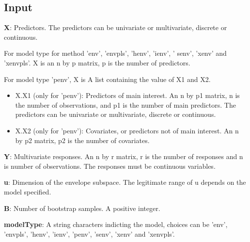 \documentclass[a4paper,11pt,openany]{memoir}
\begin{document}
\subsection*{Input}

\begin{par}
\textbf{X}: Predictors.   The predictors can be univariate or multivariate, discrete or continuous.
\end{par} \vspace{1em}
\begin{par}
For model type for method 'env', 'envpls', 'henv', 'ienv', ' senv', 'xenv' and 'xenvpls'. X is an n by p matrix, p is the number of predictors.
\end{par} \vspace{1em}
\begin{par}
For model type 'penv', X is  A list containing the value of X1 and X2.
\end{par} \vspace{1em}
\begin{itemize}
\setlength{\itemsep}{-1ex}
   \item X.X1 (only for 'penv'): Predictors of main interest. An n by p1 matrix, n is the number of observations, and p1 is the number of main predictors. The predictors can be univariate or multivariate, discrete or continuous.
   \item X.X2 (only for 'penv'): Covariates, or predictors not of main interest.  An n by p2 matrix, p2 is the number of covariates.
\end{itemize}
\begin{par}
\textbf{Y}: Multivariate responses. An n by r matrix, r is the number of responses and n is number of observations. The responses must be continuous variables.
\end{par} \vspace{1em}
\begin{par}
\textbf{u}: Dimension of the envelope subspace. The legitimate range of u depends on the model specified.
\end{par} \vspace{1em}
\begin{par}
\textbf{B}: Number of bootstrap samples.  A positive integer.
\end{par} \vspace{1em}
\begin{par}
\textbf{modelType}: A string characters indicting the model, choices can be 'env', 'envpls', 'henv', 'ienv', 'penv', 'senv', 'xenv' and 'xenvpls'.
\end{par} \vspace{1em}
\end{document}
